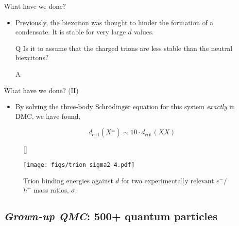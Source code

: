 \documentclass[12pt, pdf, hyperref={draft}, usenames, dvipsnames]{beamer}
\newcommand{\red}[1]{{\bf\color{LancsRed}{#1}}}
\newcommand{\blue}[1]{{\bf\color{NavyBlue}{#1}}}
\begin{document}
\begin{frame}{What have we done?}
  \begin{itemize}
    \item Previously, the biexciton was thought to hinder the formation of a
    condensate. It is stable for very large $d$ values.

    \item [Q] Is it \blue{safe} to assume that the charged trions are less
    stable than
    the neutral biexcitons?

    \item [A] \red{Nope.}
  \end{itemize}
\end{frame}

\begin{frame}{What have we done? (II)}
  \begin{itemize}
    \item By solving the three-body Schr\"{o}dinger equation for this
    system \textit{exactly} in DMC, we have found,

    \begin{equation}
      d_{\text{crit}}(X^{\pm}) \sim 10 \cdot d_{\text{crit}}(XX)
    \end{equation}
  \end{itemize}

\begin{figure}[H]
  [\FBwidth]
  {\caption{Trion binding energies against $d$ for two experimentally
  relevant $e^-$/$h^+$ mass ratios, $\sigma$.}\label{fig:trion}}
  {\texttt{[image: figs/trion\_sigma2\_4.pdf]}}
\end{figure}

\end{frame}


\subsection{{\itshape\/Grown-up QMC}: 500+ quantum particles}
\end{document}
